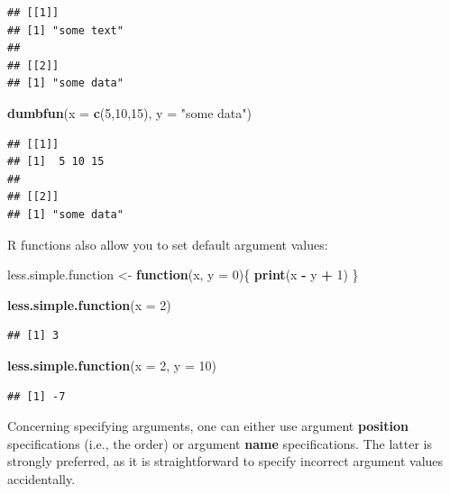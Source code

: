 \documentclass[
]{book}
\newenvironment{Shaded}{\begin{snugshade}}{\end{snugshade}}
\newcommand{\AttributeTok}[1]{\textcolor[rgb]{0.13,0.29,0.53}{#1}}
\newcommand{\ControlFlowTok}[1]{\textcolor[rgb]{0.13,0.29,0.53}{\textbf{#1}}}
\newcommand{\DecValTok}[1]{\textcolor[rgb]{0.00,0.00,0.81}{#1}}
\newcommand{\FunctionTok}[1]{\textcolor[rgb]{0.13,0.29,0.53}{\textbf{#1}}}
\newcommand{\NormalTok}[1]{#1}
\newcommand{\OtherTok}[1]{\textcolor[rgb]{0.56,0.35,0.01}{#1}}
\newcommand{\SpecialCharTok}[1]{\textcolor[rgb]{0.81,0.36,0.00}{\textbf{#1}}}
\newcommand{\StringTok}[1]{\textcolor[rgb]{0.31,0.60,0.02}{#1}}
\begin{document}
\begin{verbatim}
## [[1]]
## [1] "some text"
## 
## [[2]]
## [1] "some data"
\end{verbatim}

\begin{Shaded}
\begin{Highlighting}[]
\FunctionTok{dumbfun}\NormalTok{(}\AttributeTok{x =} \FunctionTok{c}\NormalTok{(}\DecValTok{5}\NormalTok{,}\DecValTok{10}\NormalTok{,}\DecValTok{15}\NormalTok{), }\AttributeTok{y =} \StringTok{"some data"}\NormalTok{)}
\end{Highlighting}
\end{Shaded}

\begin{verbatim}
## [[1]]
## [1]  5 10 15
## 
## [[2]]
## [1] "some data"
\end{verbatim}

R functions also allow you to set default argument values:

\begin{Shaded}
\begin{Highlighting}[]
\NormalTok{less.simple.function }\OtherTok{\textless{}{-}} \ControlFlowTok{function}\NormalTok{(x, }\AttributeTok{y =} \DecValTok{0}\NormalTok{)\{}
  \FunctionTok{print}\NormalTok{(x }\SpecialCharTok{{-}}\NormalTok{ y }\SpecialCharTok{+} \DecValTok{1}\NormalTok{)}
\NormalTok{\}}

\FunctionTok{less.simple.function}\NormalTok{(}\AttributeTok{x =} \DecValTok{2}\NormalTok{)}
\end{Highlighting}
\end{Shaded}

\begin{verbatim}
## [1] 3
\end{verbatim}

\begin{Shaded}
\begin{Highlighting}[]
\FunctionTok{less.simple.function}\NormalTok{(}\AttributeTok{x =} \DecValTok{2}\NormalTok{, }\AttributeTok{y =} \DecValTok{10}\NormalTok{)}
\end{Highlighting}
\end{Shaded}

\begin{verbatim}
## [1] -7
\end{verbatim}

Concerning specifying arguments, one can either use argument \textbf{position} specifications (i.e., the order) or argument \textbf{name} specifications. The latter is strongly preferred, as it is straightforward to specify incorrect argument values accidentally.
\end{document}
